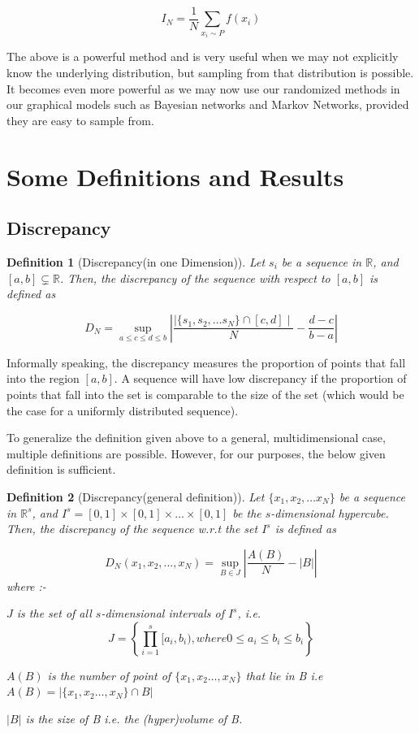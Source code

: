 \documentclass[12pt,letterpaper, twoside]{article}
\newtheorem{definition}{Definition}
\theoremstyle{definition}
\begin{document}
$$
I_N = \frac{1}{N} \sum_{x_i \sim P} f(x_i)
$$

The above is a powerful method and is very useful when we may not explicitly know the underlying distribution, but sampling from that distribution is possible. It becomes even more powerful as we may now use our randomized methods in our graphical models such as Bayesian networks and Markov Networks, provided they are easy to sample from.

\section{Some Definitions and Results}

\subsection{Discrepancy}

\begin{definition}[Discrepancy(in one Dimension)]
Let {$s_i$} be a sequence in $\mathbb{R}$, and $[a,b] \subsetneq \mathbb{R}$. Then, the \emph{discrepancy} of the sequence with respect to $[a,b]$ is defined as


$$
D_N = \sup_{a \leq c \leq d \leq b} \left| \frac{\mid \{s_1,s_2,\ldots s_N\} \cap [c,d]\mid}{N} - \frac{d - c}{b - a} \right| 
$$
\end{definition}
Informally speaking, the discrepancy measures the proportion of points that fall into the region $[a,b]$. A sequence will have low discrepancy if the proportion of points that fall into the set is comparable to the size of the set (which would be the case for a uniformly distributed sequence).

To generalize the definition given above to a general, multidimensional case, multiple definitions are possible. However, for our purposes, the below given definition is sufficient. 

\begin{definition}[Discrepancy(general definition)]
Let $\{x_1,x_2,\ldots x_N\}$ be a sequence in $\mathbb{R}^s$, and $I^s = [0,1] \times [0,1] \times \ldots \times [0,1]$ be the $s$-dimensional hypercube. Then, the discrepancy of the sequence w.r.t the set $I^s$ is defined as 

$$
D_N(x_1,x_2,\ldots,x_N) = \sup_{B \in J} \left| \frac{A(B)}{N} - |B|\right|
$$where :-

$J$ is the set of all $s$-dimensional intervals of $I^s$, i.e. 
$$
J = \left\{ \prod_{i=1}^{s} [a_i,b_i), where 0 \leq a_i \leq b_i \leq b_i \right\}
$$

$A(B)$ is the number of point of $\{x_1,x_2 \ldots ,x_N\}$ that lie in B i.e
$ A(B) = \left| \{x_1,x_2 \ldots ,x_N\} \cap B\right| $

$|B|$ is the size of B i.e. the (hyper)volume of B.
\end{definition}
\end{document}
